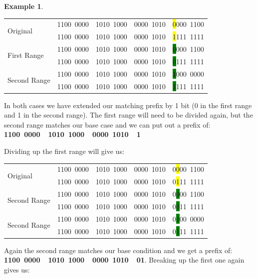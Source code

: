 \documentclass[pdf,bookmarks,colorlinks=true]{article}
\theoremstyle{definition}
\newtheorem{example}{Example}[section]
\begin{document}
\begin{example}
\begin{center}
	\begin{tabular}{|l|l|}\hline
		\multirow{2}{*}{Original} & 1100~0000~~1010~1000~~0000~1010~~\colorbox{yellow}{0}000~1100 \\
		& 1100~0000~~1010~1000~~0000~1010~~\colorbox{yellow}{1}111~1111 \\ \hline
		\multirow{2}{*}{First Range} & 1100~0000~~1010~1000~~0000~1010~~\colorbox{green}{0}000~1100 \\
		& 1100~0000~~1010~1000~~0000~1010~~\colorbox{green}{0}111~1111 \\ \hline
		\multirow{2}{*}{Second Range} & 1100~0000~~1010~1000~~0000~1010~~\colorbox{green}{1}000~0000 \\
		& 1100~0000~~1010~1000~~0000~1010~~\colorbox{green}{1}111~1111 \\ \hline
	\end{tabular}
\end{center}



In both cases we have extended our matching prefix by 1 bit (0 in the first range and 1 in the second range). The first range will need to be divided again, but the second range matches our base case and we can put out a prefix of: \textbf{1100~0000~~1010~1000~~0000~1010~~1}

Dividing up the first range will give us:\bigskip

\begin{center}
	\begin{tabular}{|l|l|}\hline
		\multirow{2}{*}{Original} & 1100~0000~~1010~1000~~0000~1010~~0\colorbox{yellow}{0}00~1100 \\
		& 1100~0000~~1010~1000~~0000~1010~~0\colorbox{yellow}{1}11~1111 \\ \hline
		\multirow{2}{*}{Second Range} & 1100~0000~~1010~1000~~0000~1010~~0\colorbox{green}{0}00~1100 \\
		& 1100~0000~~1010~1000~~0000~1010~~0\colorbox{green}{0}11~1111 \\ \hline
		\multirow{2}{*}{Second Range} & 1100~0000~~1010~1000~~0000~1010~~0\colorbox{green}{1}00~0000 \\
		& 1100~0000~~1010~1000~~0000~1010~~0\colorbox{green}{1}11~1111 \\ \hline
	\end{tabular}
\end{center}

Again the second range matches our base condition and we get a prefix of: \textbf{1100~0000~~1010~1000~~0000~1010~~01}. Breaking up the first one again gives us:\bigskip


\end{example}
\end{document}
